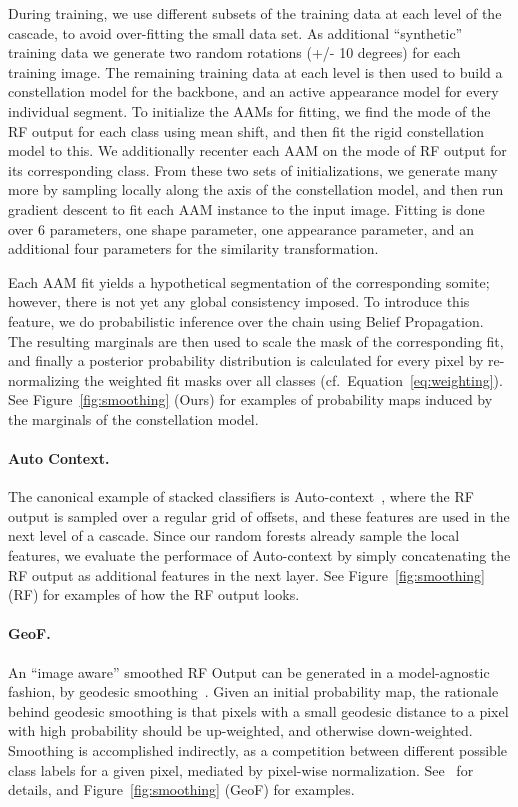 \documentclass[10pt,twocolumn,letterpaper]{article}
\begin{document}
During training, we use different subsets of the training data at each level of the cascade, to avoid over-fitting the small data set. As additional ``synthetic'' training data we generate two random rotations (+/- 10 degrees) for each training image.  The remaining training data at each level is then used to build a constellation model for the backbone, and an active appearance model for every individual segment.  To initialize the AAMs for fitting, we find the mode of the RF output for each class using mean shift, and then fit the rigid constellation model to this.  We additionally recenter each AAM on the mode of RF output for its corresponding class.  From these two sets of initializations, we generate many more by sampling locally along the axis of the constellation model, and then run gradient descent to fit each AAM instance to the input image.  Fitting is done over 6 parameters, one shape parameter, one appearance parameter, and an additional four parameters for the similarity transformation.

Each AAM fit yields a hypothetical segmentation of the corresponding somite; however, there is not yet any global consistency imposed.  To introduce this feature, we do probabilistic inference over the chain using Belief Propagation.  The resulting marginals are then used to scale the mask of the corresponding fit, and finally a posterior probability distribution is calculated for every pixel by re-normalizing the weighted fit masks over all classes (cf.\ Equation~\eqref{eq:weighting}).  See Figure~\ref{fig:smoothing} (Ours) for examples of probability maps induced by the marginals of the constellation model.

\paragraph{Auto Context. }
The canonical example of stacked classifiers is Auto-context~\cite{AutoContext2008}, where the RF output is sampled over a regular grid of offsets, and these features are used in the next level of a cascade.  Since our random forests already sample the local features, we evaluate the performace of Auto-context by simply concatenating the RF output as additional features in the next layer.  See Figure~\ref{fig:smoothing} (RF) for examples of how the RF output looks.

\paragraph{GeoF. }
An ``image aware'' smoothed RF Output can be generated in a model-agnostic fashion, by geodesic smoothing~\cite{GeoForests2013}. 
Given an initial probability map, the rationale behind geodesic smoothing is that pixels with a small geodesic distance to a pixel with high probability should be up-weighted, and otherwise down-weighted. Smoothing is accomplished indirectly, as a competition between different possible class labels for a given pixel, mediated by pixel-wise normalization. See~\cite{GeoForests2013} for details, and Figure~\ref{fig:smoothing} (GeoF) for examples.
\end{document}
